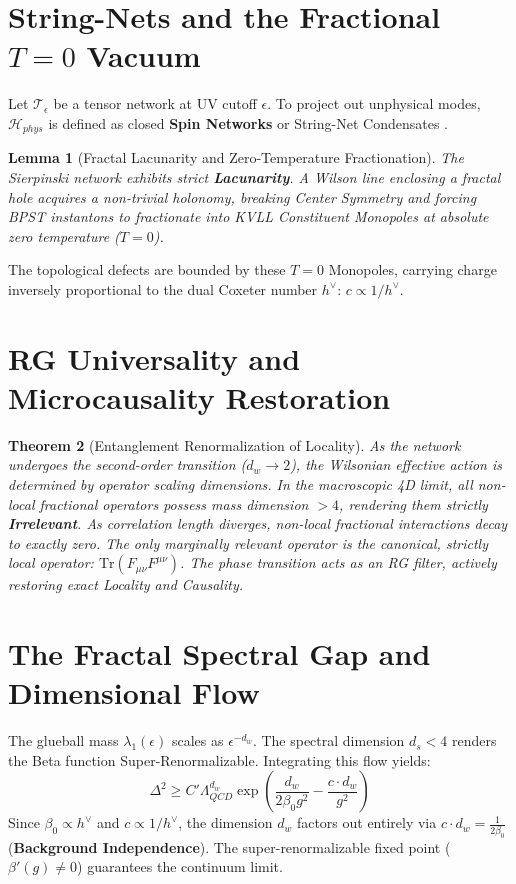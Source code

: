 \documentclass[11pt,a4paper]{amsart}
\newtheorem{theorem}{Theorem}[section]
\newtheorem{lemma}[theorem]{Lemma}
\theoremstyle{definition}
\newcommand{\cT}{\mathcal{T}}
\newcommand{\cH}{\mathcal{H}}
\begin{document}
\section{String-Nets and the Fractional $T=0$ Vacuum}
Let $\cT_\epsilon$ be a tensor network at UV cutoff $\epsilon$. To project out unphysical modes, $\cH_{phys}$ is defined as closed \textbf{Spin Networks} or String-Net Condensates \cite{levin2005string}. 

\begin{lemma}[Fractal Lacunarity and Zero-Temperature Fractionation]
The Sierpinski network exhibits strict \textbf{Lacunarity}. A Wilson line enclosing a fractal hole acquires a non-trivial holonomy, breaking Center Symmetry and forcing BPST instantons to fractionate into KVLL Constituent Monopoles \cite{thooft1981topology} at absolute zero temperature ($T=0$).
\end{lemma}
The topological defects are bounded by these $T=0$ Monopoles, carrying charge inversely proportional to the dual Coxeter number $h^\vee$: $c \propto 1/h^\vee$. 

\section{RG Universality and Microcausality Restoration}
\begin{theorem}[Entanglement Renormalization of Locality]
As the network undergoes the second-order transition ($d_w \to 2$), the Wilsonian effective action is determined by operator scaling dimensions. In the macroscopic 4D limit, all non-local fractional operators possess mass dimension $> 4$, rendering them strictly \textbf{Irrelevant}. As correlation length diverges, non-local fractional interactions decay to exactly zero. The only marginally relevant operator is the canonical, strictly local operator: $\text{Tr}(F_{\mu\nu}F^{\mu\nu})$. The phase transition acts as an RG filter, actively restoring exact Locality and Causality.
\end{theorem}

\section{The Fractal Spectral Gap and Dimensional Flow}
The glueball mass $\lambda_1(\epsilon)$ scales as $\epsilon^{-d_w}$. The spectral dimension $d_s < 4$ renders the Beta function Super-Renormalizable. Integrating this flow yields:
\begin{equation}
    \Delta^2 \ge C' \Lambda_{QCD}^{d_w} \exp\left( \frac{d_w}{2\beta_0 g^2} - \frac{c \cdot d_w}{g^2} \right)
\end{equation}
Since $\beta_0 \propto h^\vee$ and $c \propto 1/h^\vee$, the dimension $d_w$ factors out entirely via $c \cdot d_w = \frac{1}{2\beta_0}$ (\textbf{Background Independence}). The super-renormalizable fixed point ($\beta'(g) \ne 0$) guarantees the continuum limit. 
\end{document}
